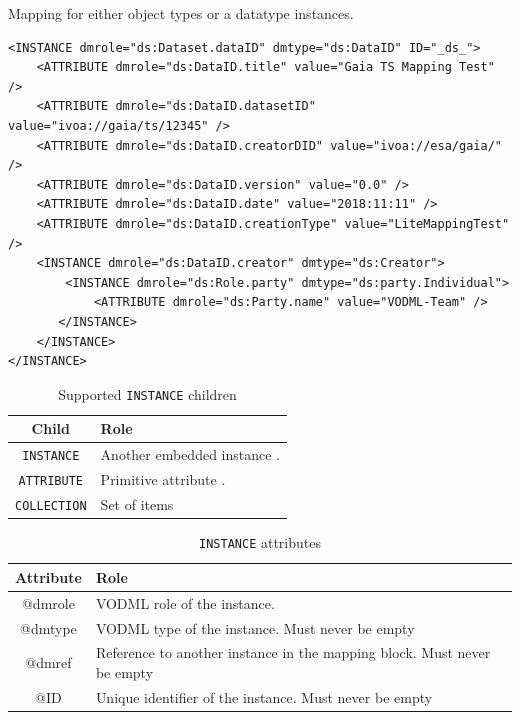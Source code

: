 \documentclass[11pt,a4paper]{ivoa}
\begin{document}
Mapping for either object types or a datatype instances.


\begin{lstlisting}[caption={INSTANCE block example},style=XML]
<INSTANCE dmrole="ds:Dataset.dataID" dmtype="ds:DataID" ID="_ds_">
    <ATTRIBUTE dmrole="ds:DataID.title" value="Gaia TS Mapping Test" />
    <ATTRIBUTE dmrole="ds:DataID.datasetID" value="ivoa://gaia/ts/12345" />
    <ATTRIBUTE dmrole="ds:DataID.creatorDID" value="ivoa://esa/gaia/" />
    <ATTRIBUTE dmrole="ds:DataID.version" value="0.0" />
    <ATTRIBUTE dmrole="ds:DataID.date" value="2018:11:11" />
    <ATTRIBUTE dmrole="ds:DataID.creationType" value="LiteMappingTest" />
    <INSTANCE dmrole="ds:DataID.creator" dmtype="ds:Creator">
        <INSTANCE dmrole="ds:Role.party" dmtype="ds:party.Individual">
            <ATTRIBUTE dmrole="ds:Party.name" value="VODML-Team" />
       </INSTANCE>
    </INSTANCE>
</INSTANCE>
\end{lstlisting}


\begin{table}[hbtp]
\small
\centering
\begin{tabulary}{\linewidth}{|c|J|}       
       \hline 
           \textbf{Child} &  
           \textbf{Role} \\
       \hline         \hline  
           \texttt{INSTANCE}    & 
           Another embedded instance . \\       
       \hline  
           \texttt{ATTRIBUTE}    & 
           Primitive attribute . \\       
       \hline  
            \texttt{COLLECTION}    & 
           Set of items\\      
       \hline 
     \end{tabulary}
     \caption{Supported  \texttt{INSTANCE} children} 
     \label{tbl:inst-chilrdren}
\end{table}

\begin{table}[hbtp]
\small
\centering
\begin{tabulary}{\linewidth}{|c|J|}       
       \hline 
            \textbf{Attribute} &  
            \textbf{Role}\\
       \hline  
            @dmrole    & 
            VODML role of the instance.  \\
       \hline  
            @dmtype & 
            VODML type of the instance.  \newline Must never be empty \\
       \hline  
            @dmref  & 
            Reference to another instance in the mapping block. 
            \newline  Must never be empty\\          
       \hline  
            @ID  & 
            Unique identifier of the instance. 
            \newline  Must never be empty\\
       \hline 
     \end{tabulary}
     \caption{\texttt{INSTANCE} attributes} 
     \label{tbl:inst-att}
 \end{table}
\end{document}
